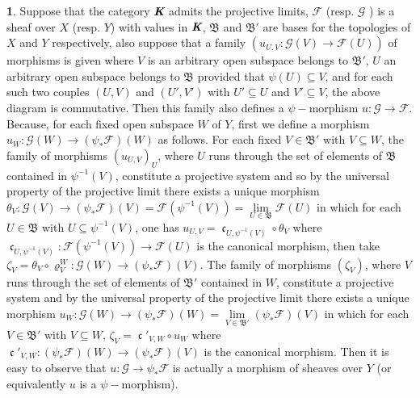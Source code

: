 \documentclass[12pt]{amsart}
\newcommand{\can}{\operatorname{\mathfrak{c}}}
\theoremstyle{definition}
\newtheorem{bk}[proposition]{}
\begin{document}
\begin{bk}
Suppose that the category $\emph{\textbf{K}}$ admits the projective limits, $\mathscr{F}$ (resp. $\mathscr{G}$ ) is a sheaf over $X$ (resp. $Y$) with values in  $\emph{\textbf{K}}$, $\mathfrak{B}$ and $\mathfrak{B}'$ are bases for the topologies of $X$ and $Y$ respectively, also suppose that a family $(u_{U,V}:\mathscr{G}(V)\rightarrow\mathscr{F}(U))$ of morphisms is given where $V$ is an arbitrary open subspace belongs to $\mathfrak{B}'$, $U$ an arbitrary open subspace belongs to $\mathfrak{B}$ provided that $\psi(U)\subseteq V$, and for each such two couples $(U,V)$ and $(U',V')$ with $U'\subseteq U$ and $V'\subseteq V$, the above diagram is commutative. Then this family also defines a $\psi-$morphism $u:\mathscr{G}\rightarrow\mathscr{F}$. Because, for each fixed open subspace $W$ of $Y$, first we define a morphism $u_{W}:\mathscr{G}(W)\rightarrow(\psi_{\ast}\mathscr{F})(W)$ as follows.
For each fixed $V\in\mathfrak{B}'$ with $V\subseteq W$, the family of morphisms $(u_{U,V})_{U}$, where $U$ runs through the set of elements of $\mathfrak{B}$ contained in $\psi^{-1}(V)$, constitute a projective system and so by the universal property of the projective limit there exists a unique morphism $\theta_{V}:\mathscr{G}(V)\rightarrow(\psi_{\ast}\mathscr{F})(V)=
\mathscr{F}(\psi^{-1}(V))=
\lim\limits_{U\in\mathfrak{B}}\mathscr{F}(U)$ in which for each
$U\in\mathfrak{B}$ with $U\subseteq\psi^{-1}(V)$, one has $u_{U,V}=\can_{U,\psi^{-1}(V)}\circ\theta_{V}$ where $\can_{U,\psi^{-1}(V)}:\mathscr{F}(\psi^{-1}(V))\rightarrow\mathscr{F}(U)$ is the canonical morphism, then take $\zeta_{V}=\theta_{V}\circ\varrho_{V}^{W}:
\mathscr{G}(W)\rightarrow(\psi_{\ast}\mathscr{F})(V)$. The family of morphisms $(\zeta_{V})$, where $V$ runs through the set of elements of $\mathfrak{B}'$ contained in $W$, constitute a projective system and by the universal property of the projective limit there exists a unique morphism $u_{W}:\mathscr{G}(W)\rightarrow(\psi_{\ast}\mathscr{F})(W)=
\lim\limits_{V\in\mathfrak{B}'}(\psi_{\ast}\mathscr{F})(V)$ in which for each $V\in\mathfrak{B}'$ with $V\subseteq W$,
$\zeta_{V}=\can'_{V,W}\circ u_{W}$ where $\can'_{V,W}:(\psi_{\ast}\mathscr{F})(W)
\rightarrow(\psi_{\ast}\mathscr{F})(V)$ is the canonical morphism. Then it is easy to observe that
 $u:\mathscr{G}\rightarrow\psi_{\ast}\mathscr{F}$ is actually a morphism of
sheaves over $Y$ (or equivalently $u$ is a $\psi-$morphism).


\end{bk}
\end{document}
